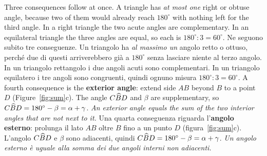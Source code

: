 \begin{bi}
Three consequences follow at once. A triangle has \emph{at most one} right or obtuse angle, because two of them would already reach $180^\circ$ with nothing left for the third angle. In a right triangle the two acute angles are complementary. In an equilateral triangle the three angles are equal, so each is $180^\circ : 3 = 60^\circ$.
\IT
Ne seguono subito tre conseguenze. Un triangolo ha \emph{al massimo un} angolo retto o ottuso, perché due di questi arriverebbero già a $180^\circ$ senza lasciare niente al terzo angolo. In un triangolo rettangolo i due angoli acuti sono complementari. In un triangolo equilatero i tre angoli sono congruenti, quindi ognuno misura $180^\circ : 3 = 60^\circ$.
\EN
A fourth consequence is the \textbf{exterior angle}: extend side $AB$ beyond $B$ to a point $D$ (Figure~\ref{fig:sum}c). The angle $C\widehat{B}D$ and $\beta$ are supplementary, so $C\widehat{B}D = 180^\circ - \beta = \alpha + \gamma$. \emph{An exterior angle equals the sum of the two interior angles that are not next to it.}
\IT
Una quarta conseguenza riguarda l'\textbf{angolo esterno}: prolunga il lato $AB$ oltre $B$ fino a un punto $D$ (figura~\ref{fig:sum}c). L'angolo $C\widehat{B}D$ e $\beta$ sono adiacenti, quindi $C\widehat{B}D = 180^\circ - \beta = \alpha + \gamma$. \emph{Un angolo esterno è uguale alla somma dei due angoli interni non adiacenti.}
\end{bi}

